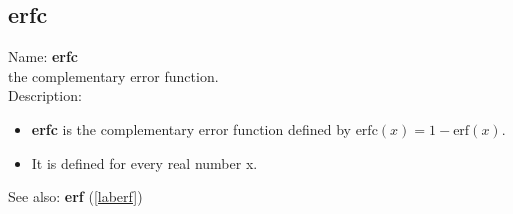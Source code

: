 \subsection{erfc}
\label{laberfc}
\noindent Name: \textbf{erfc}\\
the complementary error function.\\
\noindent Description: \begin{itemize}

\item \textbf{erfc} is the complementary error function defined by $\mathrm{erfc}(x) = 1 - \mathrm{erf}(x)$.

\item It is defined for every real number x.
\end{itemize}
See also: \textbf{erf} (\ref{laberf})
